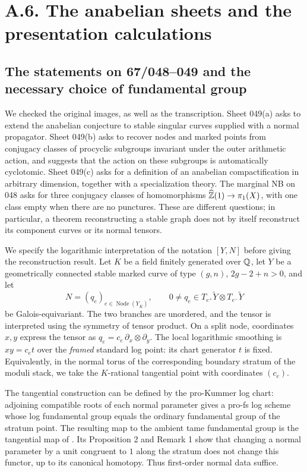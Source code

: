 \section{A.6. The anabelian sheets and the presentation calculations}
\subsection{The statements on 67/048--049 and the necessary choice of fundamental group}

We checked the original images, as well as the transcription. Sheet 049(a) asks to extend the anabelian conjecture to stable singular curves supplied with a normal propagator. Sheet 049(b) asks to recover nodes and marked points from conjugacy classes of procyclic subgroups invariant under the outer arithmetic action, and suggests that the action on these subgroups is automatically cyclotomic. Sheet 049(c) asks for a definition of an anabelian compactification in arbitrary dimension, together with a specialization theory. The marginal NB on 048 asks for three conjugacy classes of homomorphisms $\widehat{{\mathbb{Z}}}(1)\to\pi_1(X)$, with one class empty when there are no punctures. These are different questions; in particular, a theorem reconstructing a stable graph does not by itself reconstruct its component curves or its normal tensors.

We specify the logarithmic interpretation of the notation $[Y,N]$ before giving the reconstruction result. Let $K$ be a field finitely generated over ${\mathbb{Q}}$, let $Y$ be a geometrically connected stable marked curve of type $(g,n)$, $2g-2+n>0$, and let
\[
 N=(q_e)_{e\in\operatorname{Node}(Y_{\overline{K}})},
 \qquad 0\ne q_e\in T_{e^+}\widetilde{Y}\otimes
                         T_{e^-}\widetilde{Y}
\]
be Galois-equivariant. The two branches are unordered, and the tensor is interpreted using the symmetry of tensor product. On a split node, coordinates $x,y$ express the tensor as $q_e=c_e\,\partial_x\otimes\partial_y$. The local logarithmic smoothing is $xy=c_e t$ over the \emph{framed} standard log point: its chart generator $t$ is fixed. Equivalently, in the normal torus of the corresponding boundary stratum of the moduli stack, we take the $K$-rational tangential point with coordinates $(c_e)$.

The tangential construction can be defined by the pro-Kummer log chart: adjoining compatible roots of each normal parameter gives a pro-fs log scheme whose log fundamental group equals the ordinary fundamental group of the stratum point. The resulting map to the ambient tame fundamental group is the tangential map of \cite[Proposition 1]{HoshiMatsumotoNakayama2026A567}. Its Proposition 2 and Remark 1 show that changing a normal parameter by a unit congruent to $1$ along the stratum does not change this functor, up to its canonical homotopy. Thus first-order normal data suffice.

